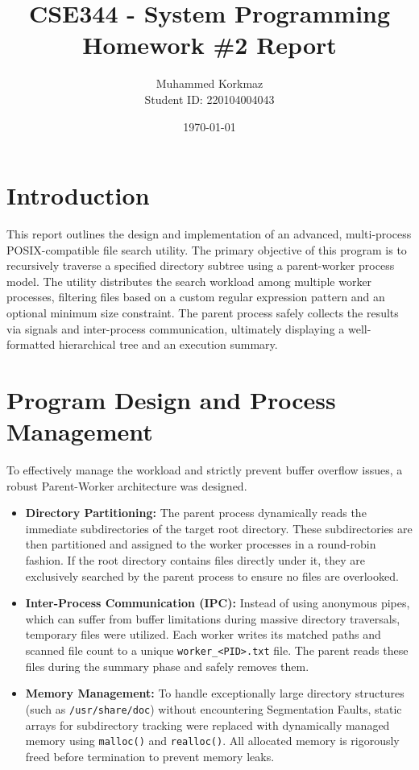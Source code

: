 \documentclass[12pt,a4paper]{article}
\title{\textbf{CSE344 - System Programming} \\ \Large Homework \#2 Report}
\author{Muhammed Korkmaz \\ Student ID: 220104004043}
\date{\today}
\begin{document}
\maketitle

\section{Introduction}
This report outlines the design and implementation of an advanced, multi-process POSIX-compatible file search utility. The primary objective of this program is to recursively traverse a specified directory subtree using a parent-worker process model. The utility distributes the search workload among multiple worker processes, filtering files based on a custom regular expression pattern and an optional minimum size constraint. The parent process safely collects the results via signals and inter-process communication, ultimately displaying a well-formatted hierarchical tree and an execution summary.

\section{Program Design and Process Management}
To effectively manage the workload and strictly prevent buffer overflow issues, a robust Parent-Worker architecture was designed.

\begin{itemize}
    \item \textbf{Directory Partitioning:} The parent process dynamically reads the immediate subdirectories of the target root directory. These subdirectories are then partitioned and assigned to the worker processes in a round-robin fashion. If the root directory contains files directly under it, they are exclusively searched by the parent process to ensure no files are overlooked.
    \item \textbf{Inter-Process Communication (IPC):} Instead of using anonymous pipes, which can suffer from buffer limitations during massive directory traversals, temporary files were utilized. Each worker writes its matched paths and scanned file count to a unique \texttt{worker\_<PID>.txt} file. The parent reads these files during the summary phase and safely removes them.
    \item \textbf{Memory Management:} To handle exceptionally large directory structures (such as \texttt{/usr/share/doc}) without encountering Segmentation Faults, static arrays for subdirectory tracking were replaced with dynamically managed memory using \texttt{malloc()} and \texttt{realloc()}. All allocated memory is rigorously freed before termination to prevent memory leaks.
\end{itemize}
\end{document}
